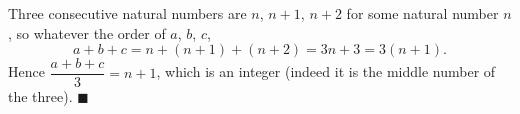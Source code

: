 Three consecutive natural numbers are $n$, $n+1$, $n+2$ for some natural number $n$, so whatever the order of $a$, $b$, $c$,
\[
a+b+c=n+(n+1)+(n+2)=3n+3=3(n+1).
\]
Hence $\dfrac{a+b+c}{3}=n+1$, which is an integer (indeed it is the middle number of the three). $\blacksquare$
